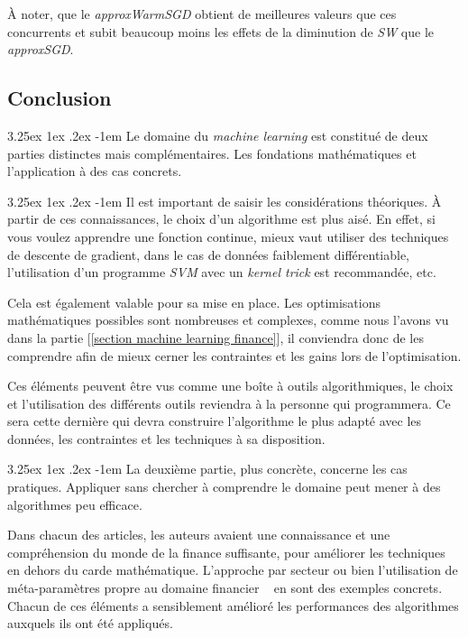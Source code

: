 \documentclass[a4paper, 11pt]{article}
\makeatletter
\renewcommand\paragraph{\@startsection{paragraph}{5}{\z@}%
  {3.25ex \@plus1ex \@minus.2ex}%
  {-1em}%
  {\normalfont\normalsize\bfseries}}
\makeatother
\begin{document}
À noter, que le \textit{approxWarmSGD} obtient de meilleures valeurs que ces concurrents et subit beaucoup moins les effets de la diminution de \textit{SW} que le \textit{approxSGD}.

\subsection{Conclusion}
\paragraph{}
Le domaine du \textit{machine learning} est constitué de deux parties distinctes mais complémentaires.
Les fondations mathématiques et l'application à des cas concrets.

\paragraph{}
Il est important de saisir les considérations théoriques. À partir de ces connaissances, le choix d'un algorithme est plus aisé. En effet, si vous voulez apprendre une fonction continue, mieux vaut utiliser des techniques de descente de gradient, dans le cas de données faiblement différentiable, l'utilisation d'un programme \textit{SVM} avec un \textit{kernel trick} est recommandée, etc.

Cela est également valable pour sa mise en place. Les optimisations mathématiques possibles sont nombreuses et complexes, comme nous l'avons vu dans la partie [\ref{section machine learning finance}], il conviendra donc de les comprendre afin de mieux cerner les contraintes et les gains lors de l'optimisation.

Ces éléments peuvent être vus comme une boîte à outils algorithmiques, le choix et l'utilisation des différents outils reviendra à la personne qui programmera. Ce sera cette dernière qui devra construire l'algorithme le plus adapté avec les données, les contraintes et les techniques à sa disposition.

\paragraph{}
La deuxième partie, plus concrète, concerne les cas pratiques. Appliquer sans chercher à comprendre le domaine peut mener à des algorithmes peu efficace.

Dans chacun des articles, les auteurs avaient une connaissance et une compréhension du monde de la finance suffisante, pour améliorer les techniques en dehors du carde mathématique. L'approche par secteur \cite{machine_learning_automated_trading} ou bien l'utilisation de méta-paramètres propre au domaine financier ~\cite{fx_trading} en sont des exemples concrets.
Chacun de ces éléments a sensiblement amélioré les performances des algorithmes auxquels ils ont été appliqués.
\end{document}
